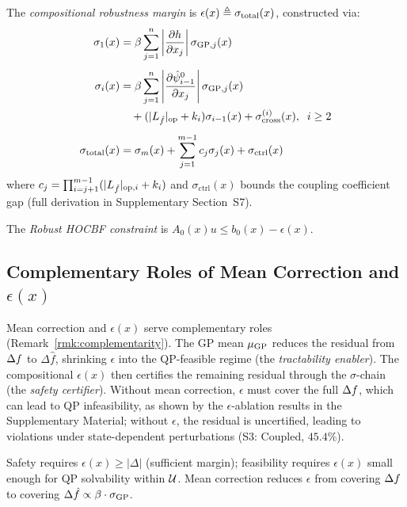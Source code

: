 \begin{definition}
\label{def:epsilon}
The \emph{compositional robustness margin} is $\epsilon(x) \triangleq \sigma_{\mathrm{total}}(x)$, constructed via:
\begin{align}
    \sigma_1(x) &= \beta \sum_{j=1}^{n} \left|\frac{\partial h}{\partial x_j}\right| \sigma_{\mathrm{GP},j}(x) \label{eq:sigma1} \\[4pt]
    \sigma_i(x) &= \beta \sum_{j=1}^{n} \left|\frac{\partial \hat{\psi}_{i-1}^0}{\partial x_j}\right| \sigma_{\mathrm{GP},j}(x) \nonumber\\
                &\quad + (|L_{\hat{f}}|_{\mathrm{op}} + k_i) \sigma_{i-1}(x) + \sigma_{\mathrm{cross}}^{(i)}(x), \;\; i \geq 2 \label{eq:sigma_recursive} \\[4pt]
    \sigma_{\mathrm{total}}(x) &= \sigma_m(x) + \sum_{j=1}^{m-1} c_j \sigma_j(x) + \sigma_{\mathrm{ctrl}}(x) \label{eq:sigma_total}
\end{align}
where $c_j = \prod_{i=j+1}^{m-1} (|L_{\hat{f}}|_{\mathrm{op},i} + k_i)$ and $\sigma_{\mathrm{ctrl}}(x)$ bounds the coupling coefficient gap (full derivation in Supplementary Section~S7).
\end{definition}

The \emph{Robust HOCBF constraint} is $A_0(x) u \leq b_0(x) - \epsilon(x)$.

\subsection{Complementary Roles of Mean Correction and $\epsilon(x)$}

Mean correction and $\epsilon(x)$ serve complementary roles (Remark~\ref{rmk:complementarity}). The GP mean $\mu_{\mathrm{GP}}$ reduces the residual from $\Delta f$ to $\Delta \hat{f}$, shrinking $\epsilon$ into the QP-feasible regime (the \emph{tractability enabler}). The compositional $\epsilon(x)$ then certifies the remaining residual through the $\sigma$-chain (the \emph{safety certifier}). Without mean correction, $\epsilon$ must cover the full $\Delta f$, which can lead to QP infeasibility, as shown by the $\epsilon$-ablation results in the Supplementary Material; without $\epsilon$, the residual is uncertified, leading to violations under state-dependent perturbations (S3: Coupled, $45.4\%$).

\begin{remark}[Complementarity]
\label{rmk:complementarity}
Safety requires $\epsilon(x) \geq |\Delta|$ (sufficient margin); feasibility requires $\epsilon(x)$ small enough for QP solvability within $\mathcal{U}$. Mean correction reduces $\epsilon$ from covering $\Delta f$ to covering $\Delta \hat{f} \propto \beta \cdot \sigma_{\mathrm{GP}}$.
\end{remark}

